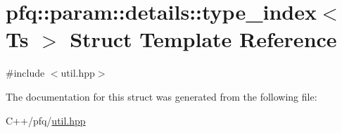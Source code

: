 \hypertarget{structpfq_1_1param_1_1details_1_1type__index}{\section{pfq\+:\+:param\+:\+:details\+:\+:type\+\_\+index$<$ Ts $>$ Struct Template Reference}
\label{structpfq_1_1param_1_1details_1_1type__index}
}


{\ttfamily \#include $<$util.\+hpp$>$}



The documentation for this struct was generated from the following file\+:\begin{DoxyCompactItemize}
\item 
C++/pfq/\hyperlink{util_8hpp}{util.\+hpp}\end{DoxyCompactItemize}
